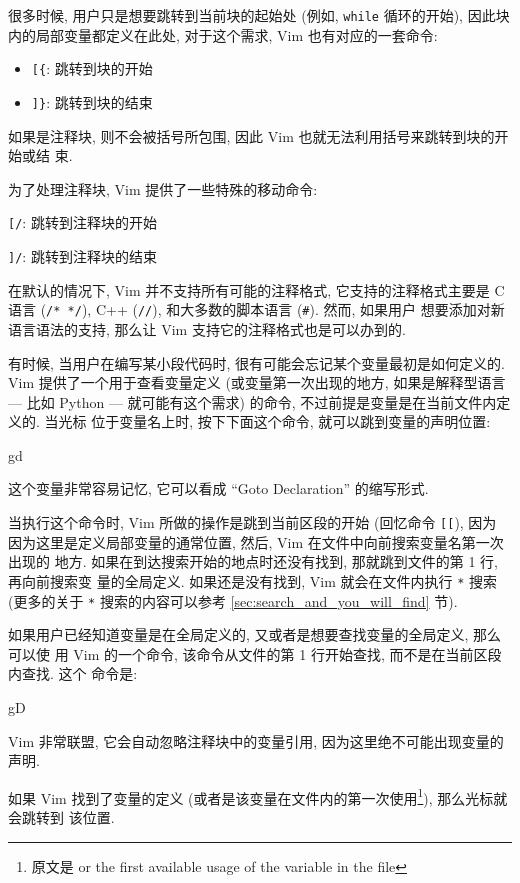 很多时候, 用户只是想要跳转到当前块的起始处 (例如, \texttt{while} 循环的开始),
因此块内的局部变量都定义在此处, 对于这个需求, Vim 也有对应的一套命令:
\begin{itemize}
    \item \verb'[{': 跳转到块的开始
    \item \verb']}': 跳转到块的结束
\end{itemize}

如果是注释块, 则不会被括号所包围, 因此 Vim 也就无法利用括号来跳转到块的开始或结
束.

为了处理注释块, Vim 提供了一些特殊的移动命令:
\begin{vimcmd}
    \item \verb'[/': 跳转到注释块的开始
    \item \verb']/': 跳转到注释块的结束
\end{vimcmd}

在默认的情况下, Vim 并不支持所有可能的注释格式, 它支持的注释格式主要是 C 语言 
(\verb'/* */'), C++ (\verb'//'), 和大多数的脚本语言 (\verb'#'). 然而, 如果用户 
想要添加对新语言语法的支持, 那么让 Vim 支持它的注释格式也是可以办到的.

有时候, 当用户在编写某小段代码时, 很有可能会忘记某个变量最初是如何定义的. Vim 
提供了一个用于查看变量定义 (或变量第一次出现的地方, 如果是解释型语言 --- 比如
Python --- 就可能有这个需求) 的命令, 不过前提是变量是在当前文件内定义的. 当光标
位于变量名上时, 按下下面这个命令, 就可以跳到变量的声明位置:
\begin{vimcmd}
gd
\end{vimcmd}
这个变量非常容易记忆, 它可以看成 ``Goto Declaration'' 的缩写形式.

当执行这个命令时, Vim 所做的操作是跳到当前区段的开始 (回忆命令 \verb'[['), 因为
因为这里是定义局部变量的通常位置, 然后, Vim 在文件中向前搜索变量名第一次出现的
地方. 如果在到达搜索开始的地点时还没有找到, 那就跳到文件的第 1 行, 再向前搜索变
量的全局定义. 如果还是没有找到, Vim 就会在文件内执行 \verb'*' 搜索 (更多的关于
\verb'*' 搜索的内容可以参考 \ref{sec:search_and_you_will_find} 节).

如果用户已经知道变量是在全局定义的, 又或者是想要查找变量的全局定义, 那么可以使
用 Vim 的一个命令, 该命令从文件的第 1 行开始查找, 而不是在当前区段内查找. 这个 
命令是:
\begin{vimcmd}
gD
\end{vimcmd}
Vim 非常联盟, 它会自动忽略注释块中的变量引用, 因为这里绝不可能出现变量的声明.

如果 Vim 找到了变量的定义 (或者是该变量在文件内的第一次使用\footnote{原文是 
or the first available usage of the variable in the file}), 那么光标就会跳转到
该位置.

